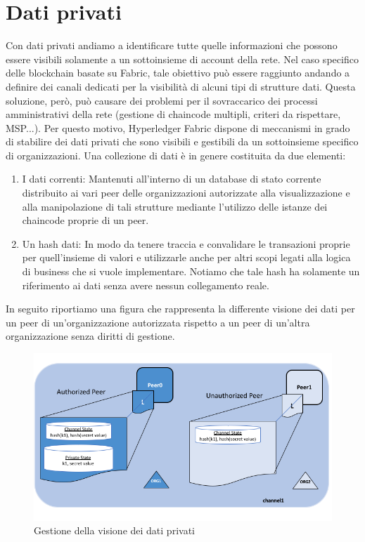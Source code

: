 \section{Dati privati}
Con dati privati andiamo a identificare tutte quelle informazioni che possono essere visibili solamente a un sottoinsieme di account della rete. Nel caso specifico delle blockchain basate su Fabric, tale obiettivo può essere raggiunto andando a definire dei canali dedicati per la visibilità di alcuni tipi di strutture dati. Questa soluzione, però, può causare dei problemi per il sovraccarico dei processi amministrativi della rete (gestione di chaincode multipli, criteri da rispettare, MSP...). Per questo motivo, Hyperledger Fabric dispone di meccanismi in grado di stabilire dei dati privati che sono visibili e gestibili da un sottoinsieme specifico di organizzazioni.
Una collezione di dati è in genere costituita da due elementi:
\newpage
\begin{enumerate}
\item I dati correnti: Mantenuti all'interno di un database di stato corrente distribuito ai vari peer delle organizzazioni autorizzate alla visualizzazione e alla manipolazione di tali strutture mediante l'utilizzo delle istanze dei chaincode proprie di un peer.
\item Un hash dati: In modo da tenere traccia e convalidare le transazioni proprie per quell'insieme di valori e utilizzarle anche per altri scopi legati alla logica di business che si vuole implementare. Notiamo che tale hash ha solamente un riferimento ai dati senza avere nessun collegamento reale.
\end{enumerate}
In seguito riportiamo una figura che rappresenta la differente visione dei dati per un peer di un'organizzazione autorizzata rispetto a un peer di un'altra organizzazione senza diritti di gestione.
\begin{figure}[h]
    \centering
    \includegraphics[width=1\textwidth]{img/data-private-vision.png}
    \caption{Gestione della visione dei dati privati}
    \label{fig:private-data}
\end{figure}
